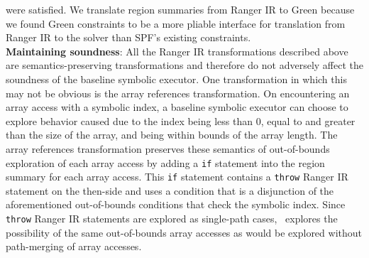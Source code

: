 were satisfied.
%
We translate region summaries from Ranger IR to Green because we found Green constraints to be a more pliable interface
for translation from Ranger IR to the solver than SPF\rq s existing constraints.\\
\textbf{Maintaining soundness}: All the Ranger IR transformations described above are semantics-preserving
transformations and therefore do not adversely affect the soundness of the baseline symbolic executor.
%
One transformation in which this may not be obvious is the array references transformation.
%
On encountering an array access with a symbolic index, a baseline symbolic executor can choose to explore behavior caused
due to the index being less than 0, equal to and greater than the size of the array, and being within bounds of
the array length.
%
The array references transformation preserves these semantics of out-of-bounds exploration of each array access by adding a
{\tt if} statement into the region summary for each array access.
%
This {\tt if} statement contains a {\tt throw} Ranger IR statement on the then-side and uses a condition that is a
disjunction of the aforementioned out-of-bounds conditions that check the symbolic index.
%
Since {\tt throw} Ranger IR statements are explored as single-path cases, \tool\
explores the possibility of the same out-of-bounds array accesses as would be explored without path-merging of array accesses.

